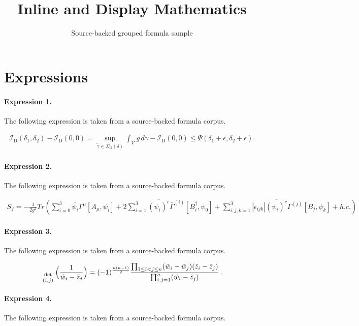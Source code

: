 \documentclass[11pt]{article}
\title{Inline and Display Mathematics}
\author{Source-backed grouped formula sample}
\date{}
\begin{document}
\maketitle
\section{Expressions}
\paragraph{Expression 1.} The following expression is taken from a source-backed formula corpus.

\begin{align*}\mathcal{I}_{\mathrm{D} }(\delta_1, \delta_2)- \mathcal{I}_{\mathrm{D} }(0,0) = \sup_{\widetilde{\gamma} \in \Sigma_{\mathrm{D} }(\delta)} \int_{\mathcal{V} } g \, d \widetilde{\gamma} - \mathcal{I}_{\mathrm{D} }(0,0) \leq \Psi( \delta_1 + \epsilon , \delta_2 + \epsilon). \end{align*}

\paragraph{Expression 2.} The following expression is taken from a source-backed formula corpus.

\begin{align*}S_f= - \frac{1}{2 g^2} Tr \left(\sum_{i=0}^{3} \overline{\psi_i} \Gamma^{\mu} [A_{\mu},\psi_i]+ 2 \sum_{i=1}^{3} \overline{(\psi_i)^c} \bar{\Gamma}^{(i)}[B^{\dagger}_i,\psi_0]+ \sum_{i,j,k=1}^3 |\epsilon_{ijk}| \overline{(\psi_i)^c} \Gamma^{(j)}[B_j, \psi_k] + h.c.\right)\end{align*}

\paragraph{Expression 3.} The following expression is taken from a source-backed formula corpus.

\begin{align*}{ \; \atop { \text{det} \atop {\scriptstyle (i,j)} } }\Big(\frac{1}{\tilde{w}_i - \tilde{z}_j} \Big) =(-1)^{\frac{n(n-1)}{2}}\frac{\prod_{1 \leq i < j \leq n} (\tilde{w}_i - \tilde{w}_j )( \tilde{z}_i - \tilde{z}_j ) }{\prod_{i,j = 1}^n ( \tilde{w}_i - \tilde{z}_j ) }\; .\end{align*}

\paragraph{Expression 4.} The following expression is taken from a source-backed formula corpus.
\end{document}
